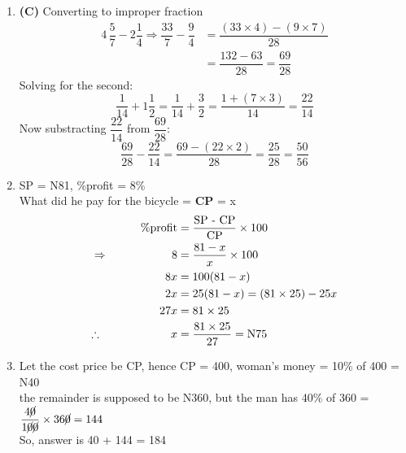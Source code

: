 \begin{multicols}{2}
\begin{enumerate}[label={\textbf{\arabic*.}}]
    \item \textbf{(C)} Converting to improper fraction 
        \begin{align*}
        4\,\dfrac{5}{7} - 2\dfrac{1}{4} \Rightarrow \dfrac{33}{7} - \dfrac{9}{4} &= \dfrac{(33\times 4) - (9 \times 7) }{28}  \\
        &= \dfrac{132 - 63}{28} = \dfrac{69}{28} 
        \end{align*}
        Solving for the second:
        \[\dfrac{1}{14} + 1\dfrac{1}{2} = \dfrac{1}{14} + \dfrac{3}{2} = \dfrac{1 + (7 \times 3)}{14} = \dfrac{22}{14}\] 
        Now substracting $\dfrac{22}{14}$ from $\dfrac{69}{28}$: 
        \[\dfrac{69}{28} - \dfrac{22}{14} = \dfrac{69 - (22 \times 2)}{28} =  \dfrac{25}{28} = \dfrac{50}{56}\]

    \item SP = N81, \%profit = 8\% \\
    What did he pay for the bicycle = \textbf{CP} = x \\
    \begin{align*}
    \%\text{profit} &= \dfrac{ \text{SP - CP}}{\text{CP}} \times 100  \\ 
    \Rightarrow \hspace{55px} 8 &= \dfrac{81 - x }{x} \times 100 \\
     \hspace{50px} 8x &= 100(81 - x)  \\
     \hspace{50px} 2x &= 25(81 - x ) = (81\times25) -25x \\
     \hspace{50px} 27x &= 81\times 25 \\
    \therefore \hspace{60px}  x &= \dfrac{81 \times 25}{27} = \text{N}75
    \end{align*}

    \item  Let the cost price be CP, hence CP = 400, woman's money = 10\% of 400 = N40 \\
    the remainder is supposed to be N360, but the man has 40\% of 360 = \(\dfrac{4\cancel{0}}{1\cancel{0}\cancel{0}} \times 36\cancel{0} = 144 \) \vspace {5px}\\
    So, answer is 40 + 144 = 184


\end{enumerate}
\end{multicols}
